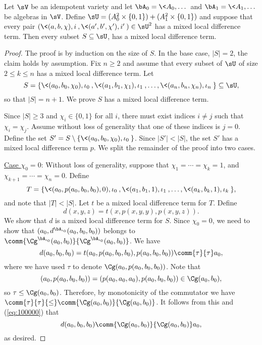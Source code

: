 \begin{thm} %
  \label{thm:mixed-local-diff-terms}
  Let $\sV$ be an idempotent variety and let
  $\bA_0 = \<A_0, \dots\>$ and   $\bA_1 = \<A_1, \dots\>$ be algebras in $\sV$. Define
  $\sU  = (A_0^2 \times \{0,1\}) + (A_1^2\times \{0,1\})$
  and suppose that every pair
  $(\<(a, b, \chi), i\>, \<(a', b', \chi'), i'\>) \in \sU^2$
  has a mixed local difference term. Then every subset $S \subseteq \sU$,
  has a mixed local difference term.
\end{thm}

\begin{proof}
The proof is by induction on the size of $S$.  In the base case, $|S| = 2$,
the claim holds by assumption.
Fix $n\geq 2$ and assume that every subset of $\sU$ of size $2\leq k \leq n$ has
a mixed local
difference term. Let
\[
S =
\{\<(a_0, b_0, \chi_0), \iota_0\>, \<(a_1, b_1, \chi_1), \iota_1\>,
\dots, \<(a_{n}, b_{n},\chi_{n}), \iota_n\>\} \subseteq \sU,\]
so that $|S| = n+1$.  We prove $S$ has a mixed local difference term.

Since $|S| \geq 3$ and $\chi_i \in \{0,1\}$ for all $i$, there must exist
indices $i\neq j$ such that $\chi_i = \chi_j$. Assume without loss of generality
that one of these indices is $j=0$.  Define
the set
$S' = S \setminus \{\<(a_0, b_0, \chi_0), \iota_0\>\}$.
Since $|S'| < |S|$, the set $S'$ has a mixed local difference term $p$.
We split the remainder of the proof into two cases.

\vskip3mm

\noindent \underline{Case $\chi_0 = 0$}:
Without loss of generality, suppose that $\chi_1 = %
\cdots =\chi_k = 1$,
and $\chi_{k+1} %
= \cdots = \chi_{n} = 0$. Define %
\[T = \{\<(a_0, p(a_0, b_0, b_0), 0), \iota_0\>,
\<(a_1, b_1, 1), \iota_1\>, %
\dots, \<(a_k, b_k, 1), \iota_k\>\},\] and 
note that $|T| < |S|$.
Let $t$ be a mixed local difference term for $T$.
Define
\[
d(x,y,z) = t(x, p(x,y,y), p(x,y,z)).
\]
We show that $d$ is a mixed local difference term for $S$.
Since $\chi_0 =0$, we need to show
that $(a_0, d^{\bA_{\iota_0}}(a_0,b_0,b_0))$ belongs to $\comm{\Cg^{\bA_{\iota_0}}(a_0,b_0)}{\Cg^{\bA_{\iota_0}}(a_0,b_0)}$.
We have
\begin{equation}
    \label{eq:100000}
  d(a_0,b_0,b_0) =
  t(a_0, p(a_0,b_0,b_0), p(a_0,b_0,b_0))\comm{\tau}{\tau} a_0,
\end{equation}
where we have used $\tau$ to denote $\Cg(a_0, p(a_0,b_0,b_0))$.
Note that
\[(a_0, p(a_0,b_0,b_0)) = (p(a_0,a_0,a_0), p(a_0,b_0,b_0)) \in \Cg(a_0, b_0),\]
so $\tau\leq \Cg(a_0,b_0)$. Therefore,
by monotonicity of the commutator we have
$\comm{\tau}{\tau} {\leq} \comm{\Cg(a_0,b_0)}{\Cg(a_0,b_0)}$.
It follows from this and (\ref{eq:100000}) that
\[d(a_0,b_0,b_0)\comm{\Cg(a_0,b_0)}{\Cg(a_0,b_0)} a_0,\]
as desired.


\end{proof}
